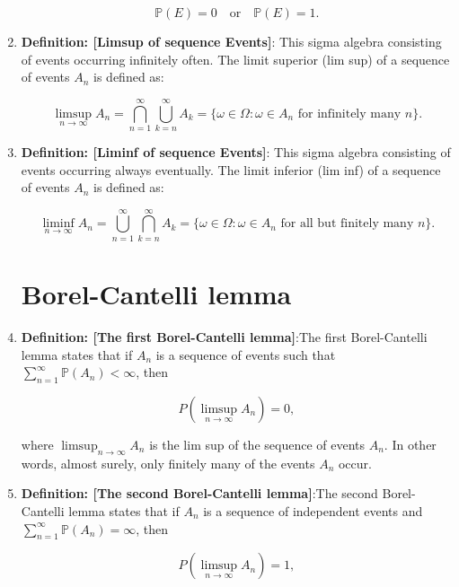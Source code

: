 \documentclass[12pt,oneside]{book}
\begin{document}
\begin{enumerate}
    \begin{equation*}
    \mathbb{P}(E) = 0 \quad \text{or} \quad \mathbb{P}(E) = 1.
    \end{equation*}
    \item \textbf{Definition: [Limsup of sequence Events]}: This sigma algebra consisting of events occurring infinitely often. The limit superior (lim sup) of a sequence of events ${A_n}$ is defined as:

    \begin{equation*}
    \limsup_{n\to\infty} A_n = \bigcap_{n=1}^\infty \bigcup_{k=n}^\infty A_k = \{ \omega \in \Omega : \omega \in A_n \text{ for infinitely many } n \}.
    \end{equation*}
    \item \textbf{Definition: [Liminf of sequence Events]}: This sigma algebra consisting of events occurring always eventually. The limit inferior (lim inf) of a sequence of events ${A_n}$ is defined as:

    \begin{equation*}
    \liminf_{n\to\infty} A_n = \bigcup_{n=1}^\infty \bigcap_{k=n}^\infty A_k = \{ \omega \in \Omega : \omega \in A_n \text{ for all but finitely many } n \}.
    \end{equation*}

\section{Borel-Cantelli lemma}

\item \textbf{Definition: [The first Borel-Cantelli lemma]}:The first Borel-Cantelli lemma states that if ${A_n}$ is a sequence of events such that $\sum_{n=1}^\infty \mathbb{P}(A_n) < \infty$, then

\begin{equation*}
{P}(\limsup_{n\to\infty} A_n) = 0,
\end{equation*}

where $\limsup_{n\to\infty} A_n$ is the lim sup of the sequence of events ${A_n}$. In other words, almost surely, only finitely many of the events $A_n$ occur.
\item \textbf{Definition: [The second Borel-Cantelli lemma]}:The second Borel-Cantelli lemma states that if ${A_n}$ is a sequence of independent events and $\sum_{n=1}^\infty \mathbb{P}(A_n) = \infty$, then

\begin{equation*}
{P}(\limsup_{n\to\infty} A_n) = 1,
\end{equation*}


\end{enumerate}
\end{document}
